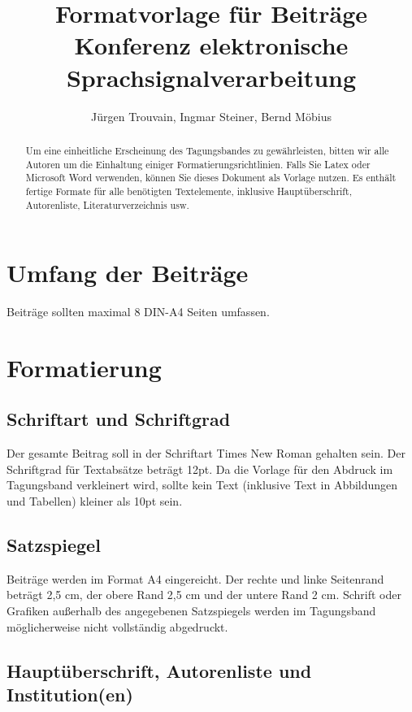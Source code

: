 \documentclass[12pt,a4paper]{article}
\title{Formatvorlage für Beiträge Konferenz elektronische Sprachsignalverarbeitung}
\author{Jürgen Trouvain, Ingmar Steiner, Bernd Möbius}
\affil{Universität des Saarlandes}
\begin{document}

\maketitle

\begin{abstract}
  Um eine einheitliche Erscheinung des Tagungsbandes zu gewährleisten, bitten wir alle Autoren 
  um die Einhaltung einiger Formatierungsrichtlinien. Falls Sie Latex oder Microsoft Word verwenden, 
  können Sie dieses Dokument als Vorlage nutzen. Es enthält fertige Formate für alle benötigten 
  Textelemente, inklusive Hauptüberschrift, Autorenliste, Literaturverzeichnis usw.
\end{abstract}

\section{Umfang der Beiträge}

Beiträge sollten maximal 8 DIN-A4 Seiten umfassen.

\section{Formatierung}

\subsection{Schriftart und Schriftgrad}

Der gesamte Beitrag soll in der Schriftart Times New Roman gehalten sein. Der Schriftgrad für 
Textabsätze beträgt 12pt. Da die Vorlage für den Abdruck im Tagungsband verkleinert wird, sollte 
kein Text (inklusive Text in Abbildungen und Tabellen) kleiner als 10pt sein. 

\subsection{Satzspiegel}

Beiträge werden im Format A4 eingereicht. Der rechte und linke Seitenrand beträgt 2,5 cm, der 
obere Rand 2,5 cm und der untere Rand 2 cm. Schrift oder Grafiken außerhalb des angegebenen 
Satzspiegels werden im Tagungsband möglicherweise nicht vollständig abgedruckt. 

\subsection{Hauptüberschrift, Autorenliste und Institution(en)}
\end{document}
